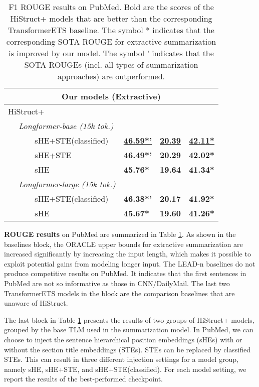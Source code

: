 \documentclass[11pt]{article}
\begin{document}
\begin{table}[ht]
\begin{tabular}[t]{@{}llll@{}}
\multicolumn{4}{c}{Our models (Extractive)}   \\ \midrule
HiStruct+  &&&\\
~~ \textit{Longformer-base (15k tok.)}  &&&  \\ 
~~~~~~ sHE+STE(classified) & \underline{\textbf{46.59*’}} & \underline{\textbf{20.39}} & \underline{\textbf{42.11*}} \\
~~~~~~ sHE+STE                      & \textbf{46.49*’} & \textbf{20.29} & \textbf{42.02*} \\
~~~~~~ sHE                          & \textbf{45.76*}  & \textbf{19.64} & \textbf{41.34*} \\ ~~ \textit{Longformer-large (15k tok.)} &&& \\ ~~~~~~ sHE+STE(classified)          & \textbf{46.38*’} & \textbf{20.17} & \textbf{41.92*} \\
~~~~~~ sHE                          & \textbf{45.67*}  & \textbf{19.60}  & \textbf{41.26*} \\ 
\bottomrule
\end{tabular}
\caption[Results on PubMed]{F1 ROUGE results on PubMed. Bold are the scores of the HiStruct+ models that are better than the corresponding TransformerETS baseline. The symbol * indicates that the corresponding SOTA ROUGE for extractive summarization is improved by our model. The symbol ' indicates that the SOTA ROUGEs (incl. all types of summarization approaches) are outperformed.}
\label{tab:pubmed_result}
\end{table}



\textbf{ROUGE results} on PubMed are summarized in Table \ref{tab:pubmed_result}. 
As shown in the baselines block, the ORACLE upper bounds for extractive summarization are increased significantly by increasing the input length, which makes it possible to exploit potential gains from modeling longer input. The LEAD-n baselines do not produce competitive results on PubMed. It indicates that the first sentences in PubMed are not so informative as those in CNN/DailyMail. The last two TransformerETS models in the block are the comparison baselines that are unaware of HiStruct.

The last block in Table \ref{tab:pubmed_result} presents the results of two groups of HiStruct+ models, grouped by the base TLM used in the summarization model. In PubMed, we can choose to inject the sentence hierarchical position embeddings (sHEs) with or without the section title embeddings (STEs). STEs can be replaced by classified STEs. This can result in three different injection settings for a model group, namely sHE, sHE+STE, and sHE+STE(classified). For each model setting, we report the results of the best-performed checkpoint. 
\end{document}
